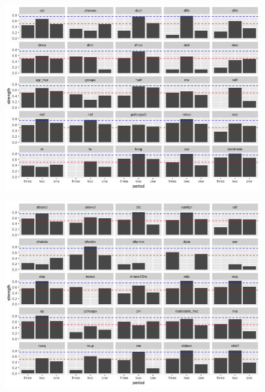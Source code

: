 \begin{landscape}
	\begin{figure}[ht]
		\includegraphics[scale = 0.75]{thirty_decompose_IV}
		\centering
	\end{figure}
\end{landscape}

\begin{landscape}
	\begin{figure}[ht]
		\includegraphics[scale = 0.75]{thirty_decompose_V}
		\centering
	\end{figure}
\end{landscape}

